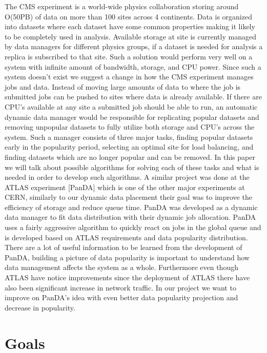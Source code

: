 \documentclass[11pt,a4page]{article}
\begin{document}
The CMS experiment is a world-wide physics collaboration storing around O(50PB) of data on more than 100 sites across 4 continents. Data is organized into datasets where each dataset have some common properties making it likely to be completely used in analysis. Available storage at site is currently managed by data managers for different physics groups, if a dataset is needed for analysis a replica is subscribed to that site. Such a solution would perform very well on a system with infinite amount of bandwidth, storage, and CPU power. Since such a system doesn't exist we suggest a change in how the CMS experiment manages jobs and data. Instead of moving large amounts of data to where the job is submitted jobs can be pushed to sites where data is already available. If there are CPU's available at any site a submitted job should be able to run, an automatic dynamic data manager would be responsible for replicating popular datasets and removing unpopular datasets to fully utilize both storage and CPU's across the system. Such a manager consists of three major tasks, finding popular datasets early in the popularity period, selecting an optimal site for load balancing, and finding datasets which are no longer popular and can be removed. In this paper we will talk about possible algorithms for solving each of these tasks and what is needed in order to develop such algorithms. A similar project was done at the ATLAS experiment [PanDA] which is one of the other major experiments at CERN, similarly to our dynamic data placement their goal was to improve the efficiency of storage and reduce queue time. PanDA was developed as a dynamic data manager to fit data distribution with their dynamic job allocation. PanDA uses a fairly aggressive algorithm to quickly react on jobs in the global queue and is developed based on ATLAS requirements and data popularity distribution. There are a lot of useful information to be learned from the development of PanDA, building a picture of data popularity is important to understand how data management affects the system as a whole. Furthermore even though ATLAS have notice improvements since the deployment of ATLAS there have also been significant increase in network traffic. In our project we want to improve on PanDA's idea with even better data popularity projection and decrease in popularity.


\section*{Goals}
\end{document}
